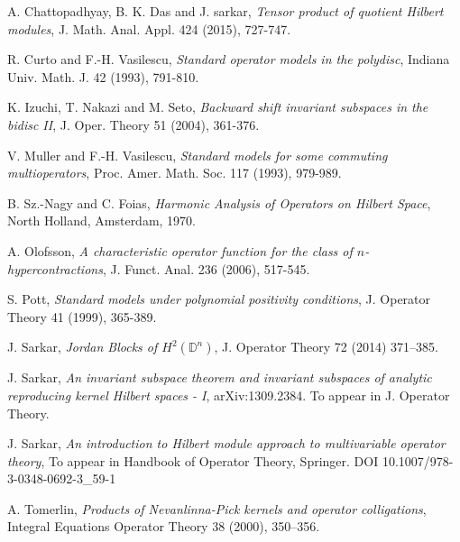 \documentclass[12pt]{amsart}
\begin{document}
\begin{thebibliography}{99}
A. Chattopadhyay, B. K. Das and J. sarkar, {\em Tensor product of
quotient Hilbert modules},  J. Math. Anal. Appl. 424 (2015),
727-747.

R. Curto and F.-H. Vasilescu, {\em Standard operator models in the
polydisc}, Indiana Univ. Math. J. 42 (1993), 791-810.

K. Izuchi, T. Nakazi and M. Seto, {\em Backward shift invariant
subspaces in the bidisc II}, J. Oper. Theory 51 (2004), 361-376.

V. Muller and F.-H. Vasilescu, {\em Standard models for some
commuting multioperators}, Proc. Amer. Math. Soc. 117 (1993),
979-989.

B. Sz.-Nagy and C. Foias, {\em Harmonic Analysis of Operators on
Hilbert Space}, North Holland, Amsterdam, 1970.

A. Olofsson, {\em A characteristic operator function for the class
of $n$-hypercontractions}, J. Funct. Anal. 236 (2006), 517-545.

S. Pott, {\em Standard models under polynomial positivity
conditions}, J. Operator Theory 41 (1999), 365-389.

J. Sarkar, {\em Jordan Blocks of $H^2({\mathbb{D}}^n)$}, J. Operator Theory 72
(2014) 371--385.

J. Sarkar, {\em An invariant subspace theorem and invariant
subspaces of analytic reproducing kernel Hilbert spaces - I},
arXiv:1309.2384. To appear in J. Operator Theory.

J. Sarkar, {\em  An introduction to Hilbert module approach to
multivariable operator theory}, To appear in Handbook of Operator
Theory, Springer. DOI 10.1007/978-3-0348-0692-3\_59-1

A. Tomerlin, {\em Products of Nevanlinna-Pick kernels and operator
colligations}, Integral Equations Operator Theory 38 (2000),
350--356.

\end{thebibliography}
\end{document}
